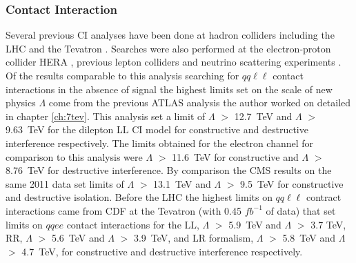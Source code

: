     \subsubsection*{Contact Interaction}
        Several previous CI analyses have been done at hadron colliders including the LHC \cite{PhysRevD.87.015010,ATLAS:2012pu,PhysRevD.87.032001,PhysRevD.87.052017} and the Tevatron \cite{PhysRevLett.103.191803,PhysRevLett.96.211801,PhysRevLett.87.231803,PhysRevLett.82.4769,PhysRevLett.79.2198,Abbiendi2003331,Abbiendi2000553}. Searches were also performed at the electron-proton collider HERA \cite{Chekanov200423,Adloff2000358,Adloff200335}, previous lepton colliders \cite{Abdallah2009.60.1,Schael2007.49.411,Abdallah2006.45.589,Abbiendi2004.33.173,Acciarri200081} and neutrino scattering experiments \cite{McFarland2005.161}. Of the results comparable to this analysis searching for $qq\ell\ell$ contact interactions in the absence of signal the highest limits set on the scale of new physics $\Lambda$ come from the previous ATLAS analysis the author worked on \cite{PhysRevD.87.015010} detailed in chapter \ref{ch:7tev}. This analysis set a limit of $\Lambda$ $>$ 12.7~TeV and $\Lambda$ $>$ 9.63~TeV for the dilepton LL CI model for constructive and destructive interference respectively. The limits obtained for the electron channel for comparison to this analysis were $\Lambda$ $>$ 11.6~TeV for constructive and $\Lambda$ $>$ 8.76~TeV for destructive interference. By comparison the CMS results on the same 2011 data \cite{PhysRevD.87.032001} set limits of $\Lambda$ $>$ 13.1~TeV and $\Lambda$ $>$ 9.5~TeV for constructive and destructive isolation. Before the LHC the highest limits on $qq\ell\ell$ contract interactions came from CDF at the Tevatron \cite{PhysRevLett.96.211801} (with 0.45 $fb^{-1}$ of data) that set limits on $qqee$ contact interactions for the LL, $\Lambda$ $>$ 5.9~TeV and $\Lambda$ $>$ 3.7 TeV, RR, $\Lambda$ $>$ 5.6~TeV and $\Lambda$ $>$ 3.9~TeV, and LR formalism, $\Lambda$ $>$ 5.8~TeV and $\Lambda$ $>$ 4.7~TeV, for constructive and destructive interference respectively. 


